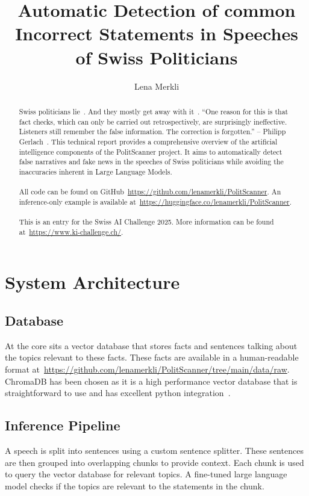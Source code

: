 \documentclass[a4paper,11pt]{report}
\title{Automatic Detection of common Incorrect Statements in Speeches of Swiss Politicians}
\author{Lena Merkli}
\begin{document}
	\maketitle
	
	\begin{abstract}
		Swiss politicians lie~\cite{SRF2022MachtWahrheit}.
		And they mostly get away with it~\cite{Hirstein2023}.
		\enquote{One reason for this is that fact checks, which can only be carried out retrospectively, are surprisingly ineffective. Listeners still remember the false information. The correction is forgotten.} -- Philipp Gerlach~\cite{SRF2022MachtWahrheit}.
		This technical report provides a comprehensive overview of the artificial intelligence components of the PolitScanner project.
		It aims to automatically detect false narratives and fake news in the speeches of Swiss politicians while avoiding the inaccuracies inherent in Large Language Models.
		\\\\
		All code can be found on GitHub~\url{https://github.com/lenamerkli/PolitScanner}.
		An inference-only example is available at~\url{https://huggingface.co/lenamerkli/PolitScanner}.
		\\\\
		This is an entry for the Swiss AI Challenge 2025.
		More information can be found at~\url{https://www.ki-challenge.ch/}.
	\end{abstract}

	\tableofcontents

	\chapter{System Architecture}\label{ch:system-architecture}

		\section{Database}\label{sec:database}
			At the core sits a vector database that stores facts and sentences talking about the topics relevant to these facts.
	    	These facts are available in a human-readable format at~\url{https://github.com/lenamerkli/PolitScanner/tree/main/data/raw}.
	    	ChromaDB has been chosen as it is a high performance vector database that is straightforward to use and has excellent python integration~\cite{chromadb}.

		\section{Inference Pipeline}\label{sec:inference-pipeline}
			A speech is split into sentences using a custom sentence splitter.
	    	These sentences are then grouped into overlapping chunks to provide context.
	    	Each chunk is used to query the vector database for relevant topics.
	    	A fine-tuned large language model checks if the topics are relevant to the statements in the chunk.
\end{document}
